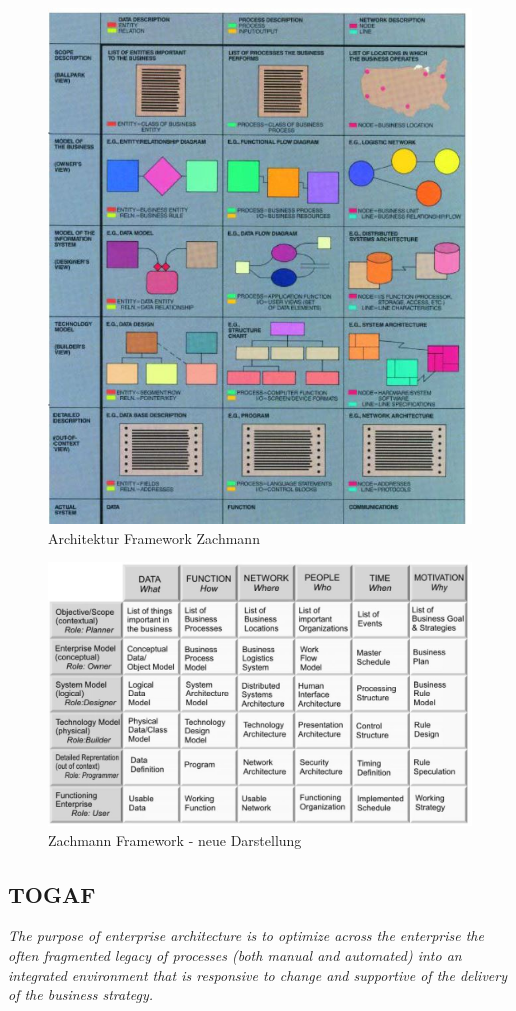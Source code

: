 \begin{figure}[h!]
\centering
\includegraphics[width=0.7\linewidth]{fig/zachmann-model}
\caption{Architektur Framework Zachmann}
\label{fig:zachmann-model}
\end{figure}

\begin{figure}[h!]
\centering
\includegraphics[width=0.7\linewidth]{fig/zachmann-model-neue-darstellung}
\caption{Zachmann Framework - neue Darstellung}
\label{fig:zachmann-model-neue-darstellung}
\end{figure}

\subsection{TOGAF}

\textit{The purpose of enterprise architecture is to optimize across the enterprise the often fragmented legacy of processes (both manual and automated) into an integrated environment that is responsive to change and supportive of the delivery of the business strategy.}

